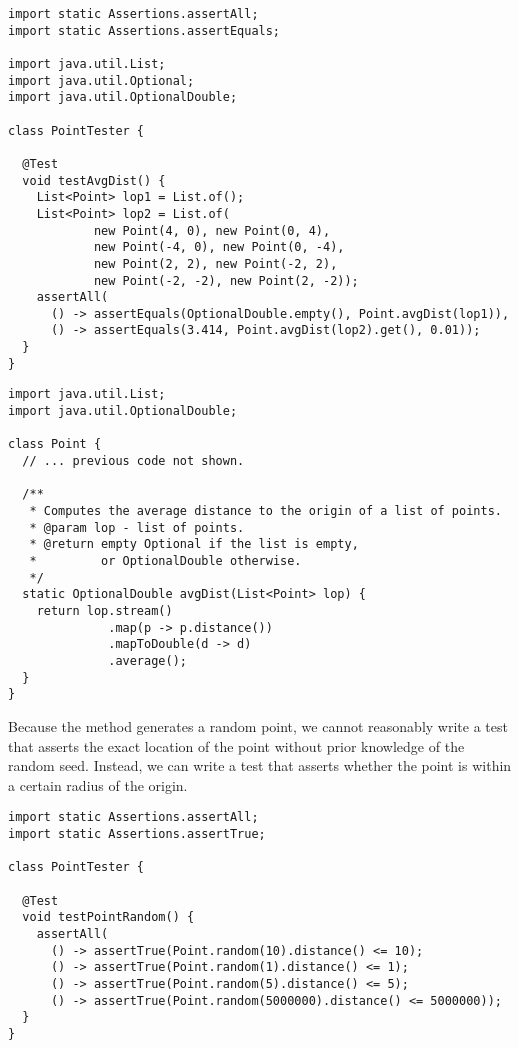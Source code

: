 \begin{lstlisting}[language=MyJava]
import static Assertions.assertAll;
import static Assertions.assertEquals;

import java.util.List;
import java.util.Optional;
import java.util.OptionalDouble;

class PointTester {

  @Test
  void testAvgDist() {
    List<Point> lop1 = List.of();
    List<Point> lop2 = List.of(
            new Point(4, 0), new Point(0, 4),
            new Point(-4, 0), new Point(0, -4),
            new Point(2, 2), new Point(-2, 2),
            new Point(-2, -2), new Point(2, -2));
    assertAll(
      () -> assertEquals(OptionalDouble.empty(), Point.avgDist(lop1)),
      () -> assertEquals(3.414, Point.avgDist(lop2).get(), 0.01));
  }
}
\end{lstlisting}

\begin{lstlisting}[language=MyJava]
import java.util.List;
import java.util.OptionalDouble;

class Point {
  // ... previous code not shown. 

  /**
   * Computes the average distance to the origin of a list of points.
   * @param lop - list of points.
   * @return empty Optional if the list is empty, 
   *         or OptionalDouble otherwise.
   */
  static OptionalDouble avgDist(List<Point> lop) {
    return lop.stream()
              .map(p -> p.distance())
              .mapToDouble(d -> d)
              .average();
  }
}
\end{lstlisting}


Because the  method generates a random point, we cannot reasonably write a test that asserts the exact location of the point without prior knowledge of the random seed. 
Instead, we can write a test that asserts whether the point is within a certain radius of the origin. 

\begin{lstlisting}[language=MyJava]
import static Assertions.assertAll;
import static Assertions.assertTrue;

class PointTester {

  @Test
  void testPointRandom() {
    assertAll(
      () -> assertTrue(Point.random(10).distance() <= 10);
      () -> assertTrue(Point.random(1).distance() <= 1);
      () -> assertTrue(Point.random(5).distance() <= 5);
      () -> assertTrue(Point.random(5000000).distance() <= 5000000));
  }
}
\end{lstlisting}

